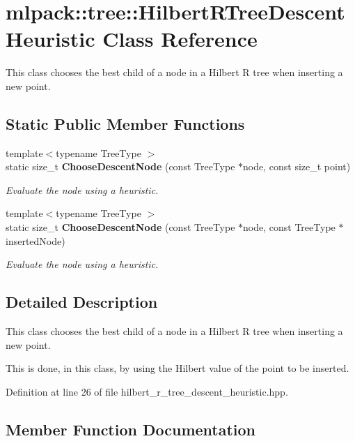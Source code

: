 \section{mlpack\+:\+:tree\+:\+:Hilbert\+R\+Tree\+Descent\+Heuristic Class Reference}
\label{classmlpack_1_1tree_1_1HilbertRTreeDescentHeuristic}


This class chooses the best child of a node in a Hilbert R tree when inserting a new point.  


\subsection*{Static Public Member Functions}
\begin{DoxyCompactItemize}
\item 
{\footnotesize template$<$typename Tree\+Type $>$ }\\static size\+\_\+t {\bf Choose\+Descent\+Node} (const Tree\+Type $\ast$node, const size\+\_\+t point)
\begin{DoxyCompactList}\small\item\em Evaluate the node using a heuristic. \end{DoxyCompactList}\item 
{\footnotesize template$<$typename Tree\+Type $>$ }\\static size\+\_\+t {\bf Choose\+Descent\+Node} (const Tree\+Type $\ast$node, const Tree\+Type $\ast$inserted\+Node)
\begin{DoxyCompactList}\small\item\em Evaluate the node using a heuristic. \end{DoxyCompactList}\end{DoxyCompactItemize}


\subsection{Detailed Description}
This class chooses the best child of a node in a Hilbert R tree when inserting a new point. 

This is done, in this class, by using the Hilbert value of the point to be inserted. 

Definition at line 26 of file hilbert\+\_\+r\+\_\+tree\+\_\+descent\+\_\+heuristic.\+hpp.



\subsection{Member Function Documentation}
